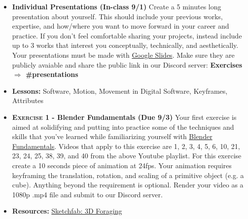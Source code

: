 \def\tues{9/1}%
\def\thur{9/3}%
% 
\begin{itemize}[noitemsep,topsep=0pt,leftmargin=*]
    \item \textbf{Individual Presentations (In-class \tues)} Create a 5 minutes long presentation about yourself. This should include your previous works, expertise, and how/where you want to move forward in your career and practice. If you don't feel comfortable sharing your projects, instead include up to 3 works that interest you conceptually, technically, and aesthetically. Your presentations must be made with \href{https://docs.google.com/presentation/}{Google Slides}. Make sure they are publicly avaiable and share the public link in our Discord server: \textbf{Exercises $\Rightarrow$ \#presentations}
\end{itemize}
\vspace{1em}
\begin{itemize}[noitemsep,topsep=0pt,leftmargin=*]
    \item \textbf{Lessons:} Software, Motion, Movement in Digital Software, Keyframes, Attributes
    \item \textbf{\textsc{Exercise 1} - Blender Fundamentals (Due \thur)} Your first exercise is aimed at solidifying and putting into practice some of the techniques and skills that you've learned while familiarizing yourself with \href{https://www.youtube.com/playlist?list=PLa1F2ddGya_-UvuAqHAksYnB0qL9yWDO6}{Blender Fundamentals}. Videos that apply to this exercise are 1, 2, 3, 4, 5, 6, 10, 21, 23, 24, 25, 38, 39, and 40 from the above Youtube playlist. For this exercise create a 10 seconds piece of animation at 24fps. Your animation requires keyframing the translation, rotation, and scaling of a primitive object (e.g. a cube). Anything beyond the requirement is optional. Render your video as a 1080p .mp4 file and submit to our Discord server.
    \item \textbf{Resources:} \href{https://sketchfab.com/search?features\=downloadable\&q\=scan+heritage\&sort\_by\=-relevance\&type\=models}{Sketchfab: 3D Foraging}
\end{itemize}